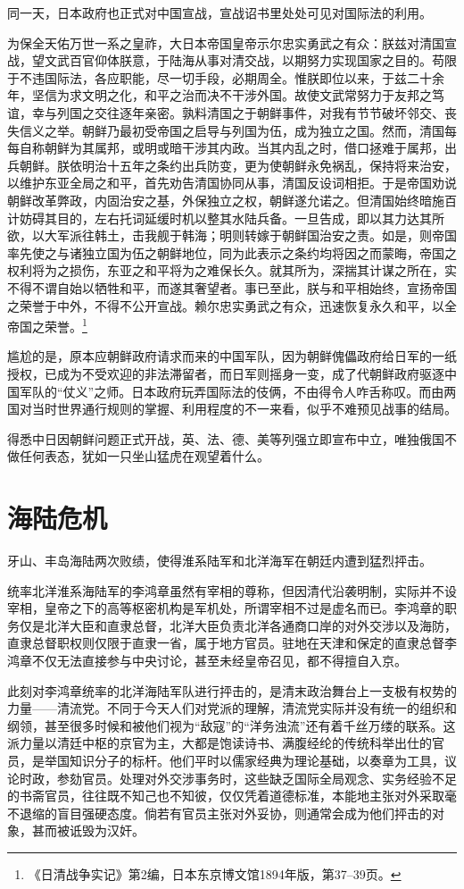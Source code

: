 \documentclass[12pt,UTF8]{ctexbook}
\begin{document}
同一天，日本政府也正式对中国宣战，宣战诏书里处处可见对国际法的利用。

为保全天佑万世一系之皇祚，大日本帝国皇帝示尔忠实勇武之有众：朕兹对清国宣战，望文武百官仰体朕意，于陆海从事对清交战，以期努力实现国家之目的。苟限于不违国际法，各应职能，尽一切手段，必期周全。惟朕即位以来，于兹二十余年，坚信为求文明之化，和平之治而决不干涉外国。故使文武常努力于友邦之笃谊，幸与列国之交往逐年亲密。孰料清国之于朝鲜事件，对我有节节破坏邻交、丧失信义之举。朝鲜乃最初受帝国之启导与列国为伍，成为独立之国。然而，清国每每自称朝鲜为其属邦，或明或暗干涉其内政。当其内乱之时，借口拯难于属邦，出兵朝鲜。朕依明治十五年之条约出兵防变，更为使朝鲜永免祸乱，保持将来治安，以维护东亚全局之和平，首先劝告清国协同从事，清国反设词相拒。于是帝国劝说朝鲜改革弊政，内固治安之基，外保独立之权，朝鲜遂允诺之。但清国始终暗施百计妨碍其目的，左右托词延缓时机以整其水陆兵备。一旦告成，即以其力达其所欲，以大军派往韩土，击我舰于韩海；明则转嫁于朝鲜国治安之责。如是，则帝国率先使之与诸独立国为伍之朝鲜地位，同为此表示之条约均将因之而蒙晦，帝国之权利将为之损伤，东亚之和平将为之难保长久。就其所为，深揣其计谋之所在，实不得不谓自始以牺牲和平，而遂其奢望者。事已至此，朕与和平相始终，宣扬帝国之荣誉于中外，不得不公开宣战。赖尔忠实勇武之有众，迅速恢复永久和平，以全帝国之荣誉。\footnote{《日清战争实记》第2编，日本东京博文馆1894年版，第37--39页。}

尴尬的是，原本应朝鲜政府请求而来的中国军队，因为朝鲜傀儡政府给日军的一纸授权，已成为不受欢迎的非法滞留者，而日军则摇身一变，成了代朝鲜政府驱逐中国军队的“仗义”之师。日本政府玩弄国际法的伎俩，不由得令人咋舌称叹。而由两国对当时世界通行规则的掌握、利用程度的不一来看，似乎不难预见战事的结局。

得悉中日因朝鲜问题正式开战，英、法、德、美等列强立即宣布中立，唯独俄国不做任何表态，犹如一只坐山猛虎在观望着什么。

\section{海陆危机}

牙山、丰岛海陆两次败绩，使得淮系陆军和北洋海军在朝廷内遭到猛烈抨击。

统率北洋淮系海陆军的李鸿章虽然有宰相的尊称，但因清代沿袭明制，实际并不设宰相，皇帝之下的高等枢密机构是军机处，所谓宰相不过是虚名而已。李鸿章的职务仅是北洋大臣和直隶总督，北洋大臣负责北洋各通商口岸的对外交涉以及海防，直隶总督职权则仅限于直隶一省，属于地方官员。驻地在天津和保定的直隶总督李鸿章不仅无法直接参与中央讨论，甚至未经皇帝召见，都不得擅自入京。

此刻对李鸿章统率的北洋海陆军队进行抨击的，是清末政治舞台上一支极有权势的力量——清流党。不同于今天人们对党派的理解，清流党实际并没有统一的组织和纲领，甚至很多时候和被他们视为“敌寇”的“洋务浊流”还有着千丝万缕的联系。这派力量以清廷中枢的京官为主，大都是饱读诗书、满腹经纶的传统科举出仕的官员，是举国知识分子的标杆。他们平时以儒家经典为理论基础，以奏章为工具，议论时政，参劾官员。处理对外交涉事务时，这些缺乏国际全局观念、实务经验不足的书斋官员，往往既不知己也不知彼，仅仅凭着道德标准，本能地主张对外采取毫不退缩的盲目强硬态度。倘若有官员主张对外妥协，则通常会成为他们抨击的对象，甚而被诋毁为汉奸。
\end{document}
